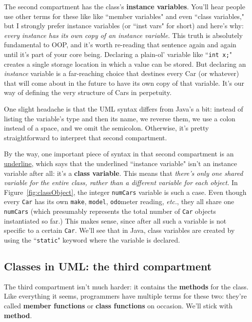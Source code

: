 The second compartment has the class's \textbf{instance variables}. You'll
hear people use other terms for these like like ``member variables" and even
``class variables," but I strongly prefer instance variables (or ``inst vars"
for short) and here's why: \textit{every instance has its own copy of an
instance variable.} This truth is absolutely fundamental to OOP, and it's
worth re-reading that sentence again and again until it's part of your core
being. Declaring a plain-ol' variable like ``\texttt{int x;}" creates a single
storage location in which a value can be stored. But declaring an
\textit{instance} variable is a far-reaching choice that destines every Car
(or whatever) that will come about in the future to have its own copy of that
variable. It's our way of defining the very structure of Cars in perpetuity.

One slight headache is that the UML syntax differs from Java's a bit: instead
of listing the variable's type and then its name, we reverse them, we use
a colon instead of a space, and we omit the semicolon. Otherwise, it's pretty
straightforward to interpret that second compartment.

By the way, one important piece of syntax in that second compartment is an
\underline{underline}, which says that the underlined ``instance variable"
isn't an instance variable after all: it's a \textbf{class variable}. This
means that \textit{there's only one shared variable for the entire class,
rather than a different variable for each object.} In
Figure~\ref{fig:classObject}, the integer \texttt{numCars} variable is such a
case. Even though every \texttt{Car} has its own \texttt{make},
\texttt{model}, \texttt{odo}meter reading, \textit{etc.}, they all share one
\texttt{numCars} (which presumably represents the total number of \texttt{Car}
objects instantiated so far.) This makes sense, since after all such a
variable is not specific to a certain \texttt{Car}. We'll see that in Java,
class variables are created by using the ``\texttt{static}" keyword where the
variable is declared.

\subsection{Classes in UML: the third compartment}

The third compartment isn't much harder: it contains the \textbf{methods} for
the class. Like everything it seems, programmers have multiple terms for these
two: they're called \textbf{member functions} or \textbf{class functions} on
occasion. We'll stick with \textbf{method}.

